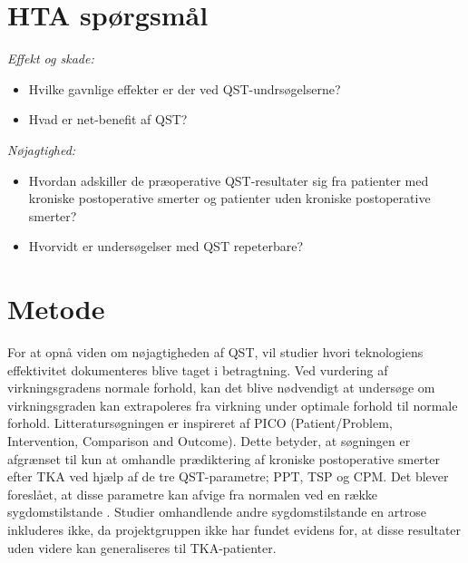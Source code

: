 \section{HTA spørgsmål}
\textit{Effekt og skade:}
\begin{itemize}
	\item Hvilke gavnlige effekter er der ved QST-undrsøgelserne? %
	\item Hvad er net-benefit af QST? %
\end{itemize}
\textit{Nøjagtighed:}
\begin{itemize}
	\item Hvordan adskiller de præoperative QST-resultater sig fra patienter med kroniske postoperative smerter og patienter uden kroniske postoperative smerter? %
	\item Hvorvidt er undersøgelser med QST repeterbare? 
\end{itemize}

\section{Metode}
For at opnå viden om nøjagtigheden af QST, vil studier hvori teknologiens effektivitet dokumenteres blive taget i betragtning. Ved vurdering af virkningsgradens normale forhold, kan det blive nødvendigt at undersøge om virkningsgraden kan extrapoleres fra virkning under optimale forhold til normale forhold. Litteratursøgningen er inspireret af PICO (Patient/Problem, Intervention, Comparison and Outcome). Dette betyder, at søgningen er afgrænset til kun at omhandle prædiktering af kroniske postoperative smerter efter TKA ved hjælp af de tre QST-parametre; PPT, TSP og CPM. Det blever foreslået, at disse parametre kan afvige fra normalen ved en række sygdomstilstande \citep{Petersen2016}. Studier omhandlende andre sygdomstilstande en artrose inkluderes ikke, da projektgruppen ikke har fundet evidens for, at disse resultater uden videre kan generaliseres til TKA-patienter. 

